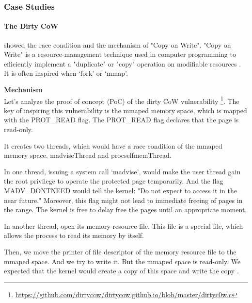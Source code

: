 \subsubsection{Case Studies}
\label{k_case}

\paragraph{The Dirty CoW}
\textcite{8019988} showed the race condition and the mechanism of "Copy on
Write". "Copy on Write" is a resource-management technique used in computer programming
to efficiently implement a "duplicate" or "copy" operation on modifiable resources \cite{6394426}.
It is often inspired when `fork' or `mmap'.

\textbf{Mechanism}\\
Let's analyze the proof of concept (PoC) of the dirty CoW \cite{8019988} vulnerability
\footnote{\url{https://github.com/dirtycow/dirtycow.github.io/blob/master/dirtyc0w.c}}.
The key of inspiring this vulnerability is the mmaped memory space, which is mapped with
the PROT\_READ flag. The PROT\_READ flag declares that the page is read-only.
% 

It creates two threads, which would have a race condition of the mmaped memory space,
madviseThread and procselfmemThread.

% 

In one thread, issuing a system call `madvise', would make the user thread gain the root
privilege to operate the protected page temporarily. And the flag MADV\_DONTNEED would
tell the kernel: "Do not expect to access it in the near future." Moreover,
this flag might not lead to immediate freeing of pages in the range. The kernel is free
to delay free the pages until an appropriate moment. %

% 

In another thread, open its memory resource file. This file is a special file, which allows
the process to read its memory by itself.

Then, we move the printer of file descriptor of the memory resource file to the mmaped
space. And we try to write it. But the mmaped space is read-only. We expected that the
kernel would create a copy of this space and write the copy \cite{8001953}.
% 

